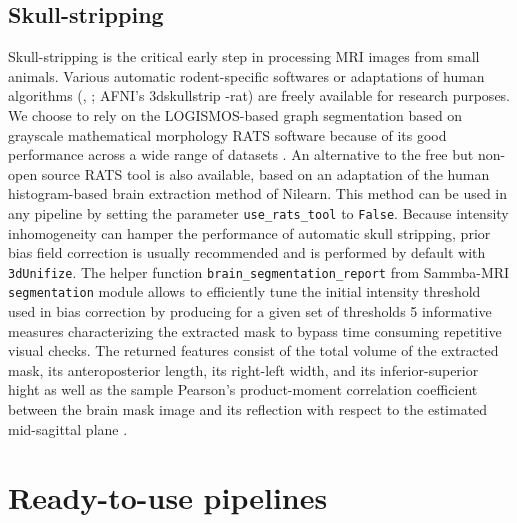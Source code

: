 \documentclass[utf8, a4paper, final, crop]{frontiersSCNS}
\newcommand{\pythoninline}[1]{\texttt{#1}}
\newcommand{\bashinline}[1]{\texttt{#1}}
\begin{document}
\subsection{Skull-stripping}
Skull-stripping is the critical early step in processing
MRI images from small animals. Various automatic rodent-specific 
softwares \citep{chou2011robust, oguz2014rats} or adaptations of human algorithms (\citeauthor{wood2013rbet}, \citeyear{wood2013rbet}; AFNI's 3dskullstrip -rat)
are freely available for research purposes. We choose to rely on
the LOGISMOS-based graph segmentation \citep{yin2010logimos} based on grayscale mathematical morphology 
RATS software  \citep{oguz2014rats} because
of its good performance across a wide range of datasets \citep{sargolzaei2018comparative}.
An alternative to the free but non-open source RATS tool is also 
available, based on an adaptation of the 
human histogram-based brain extraction method of Nilearn. 
This method can be used in any pipeline by setting the parameter
 \pythoninline{use_rats_tool} to \pythoninline{False}.
Because intensity inhomogeneity can hamper the performance of automatic skull stripping,
prior bias field correction
is usually recommended \citep{sled1998nonparametric} and is performed by default with \bashinline{3dUnifize}.
The helper function \pythoninline{brain_segmentation_report}
from Sammba-MRI \pythoninline{segmentation} module allows to
efficiently tune the initial intensity threshold used in bias correction by
producing for a given set of thresholds 5 informative measures
characterizing the extracted mask to bypass 
time consuming repetitive visual checks.
The returned features consist of the total volume of
the extracted mask, its 
anteroposterior length, its right-left width, and its inferior-superior hight as well
as the sample Pearson's product-moment correlation
coefficient between the brain mask image and its reflection
with respect to the estimated mid-sagittal plane
\citep{powell2016fully}.

\section{Ready-to-use pipelines}
\end{document}

